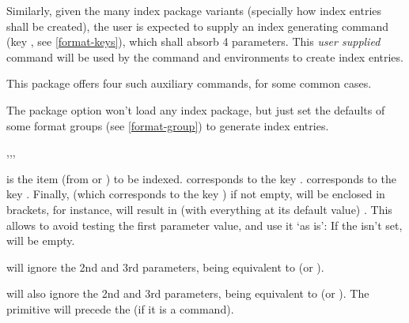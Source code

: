 \documentclass{article}
\begin{document}
Similarly, given the many index package variants (specially how index entries shall be created), the user is expected to supply an index generating command (key , see \ref{format-keys}), which shall absorb 4 parameters. This  \emph{user supplied} command will be used by 
the command  and environments  to create index entries.


This package offers four such auxiliary commands, for some common cases.

\begin{tsremark}
  The package option  won't load any index package, but just set the defaults of some format groups (see \ref{format-group}) to generate index entries.
\end{tsremark}
\begin{codedescribe}[code,new=2025/12/19,index group=Test]{\indexfmtraw,\indexfmtrawat,\indexfmtcsraw,\indexfmtcsrawat}
\begin{codesyntax} %
\end{codesyntax}
 is the item (from \tsobj{\tsobj} or ) to be indexed.  corresponds to the key .  corresponds to the key . Finally,  (which corresponds to the key ) if not empty, will be enclosed in brackets, for instance, \tsverb[code]{\tsobj[index name={some},code]{\cmd}} will result in (with everything at its default value) \tsverb[code]{\indexfmtcsrawat{[some]}{}{}{\cmd}}. This allows to avoid testing the first parameter value, and use it `as is': If the  isn't set,  will be empty.

\end{codedescribe}
 will ignore the 2nd and 3rd parameters, being equivalent to  (or ).

 will also ignore the 2nd and 3rd parameters, being equivalent to  (or ). The primitive \tsobj{\string} will precede the  (if it is a command).
\end{document}
